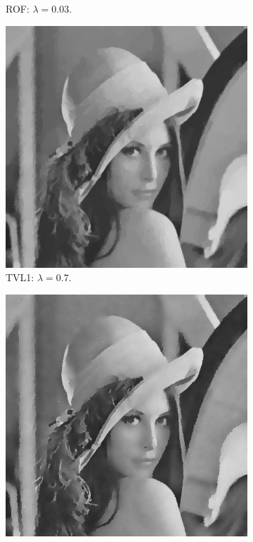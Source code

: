 \documentclass[abstracton]{scrreprt}
\begin{document}
\begin{figure}[!ht]
\begin{subfigure}[b]{0.244\textwidth}
                    \caption{ROF: $\lambda = 0.03$.\newline}
                \end{subfigure}
                \begin{subfigure}[b]{0.244\textwidth}
                    \includegraphics[width=\textwidth]{img/denoising/gauss_noise/07lena.png}
                    \caption{TVL1: $\lambda = 0.7$.\newline}
                \end{subfigure}
                \begin{subfigure}[b]{0.244\textwidth}
                    \includegraphics[width=\textwidth]{img/denoising/gauss_noise/2006.png}

\end{subfigure}
\end{figure}
\end{document}
